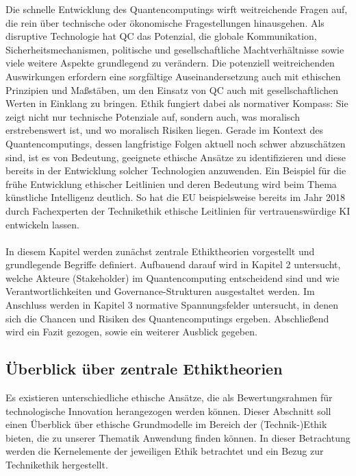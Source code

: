 Die schnelle Entwicklung des Quantencomputings wirft weitreichende Fragen auf, die rein über technische oder ökonomische Fragestellungen hinausgehen. Als disruptive Technologie hat QC das Potenzial, die globale Kommunikation, Sicherheitsmechanismen, politische und gesellschaftliche Machtverhältnisse sowie viele weitere Aspekte grundlegend zu verändern. Die potenziell weitreichenden Auswirkungen erfordern eine sorgfältige Auseinandersetzung auch mit ethischen Prinzipien und Maßstäben, um den Einsatz von QC auch mit gesellschaftlichen Werten in Einklang zu bringen. Ethik fungiert dabei als normativer Kompass: Sie zeigt nicht nur technische Potenziale auf, sondern auch, was moralisch erstrebenswert ist, und wo moralisch Risiken liegen. Gerade im Kontext des Quantencomputings, dessen langfristige Folgen aktuell noch schwer abzuschätzen sind, ist es von Bedeutung, geeignete ethische Ansätze zu identifizieren und diese bereits in der Entwicklung solcher Technologien anzuwenden. Ein Beispiel für die frühe Entwicklung ethischer Leitlinien und deren Bedeutung wird beim Thema künstliche Intelligenz deutlich. So hat die EU beispielsweise bereits im Jahr 2018 durch Fachexperten der Technikethik ethische Leitlinien für vertrauenswürdige KI entwickeln lassen. \cite{european_commission_directorate_general_for_communications_networks_content_and_technology_ethik-leitlinien_2019}
\\
\\
In diesem Kapitel werden zunächst zentrale Ethiktheorien vorgestellt und grundlegende Begriffe definiert. Aufbauend darauf wird in Kapitel 2 untersucht, welche Akteure (Stakeholder) im Quantencomputing entscheidend sind und wie Verantwortlichkeiten und Governance-Strukturen ausgestaltet werden. Im Anschluss werden in Kapitel 3  normative Spannungsfelder untersucht, in denen sich die Chancen und Risiken des Quantencomputings ergeben. Abschließend wird ein Fazit gezogen, sowie ein weiterer Ausblick gegeben.

\subsection{Überblick über zentrale Ethiktheorien}

Es existieren unterschiedliche ethische Ansätze, die als Bewertungsrahmen für technologische Innovation herangezogen werden können. Dieser Abschnitt soll einen Überblick über ethische Grundmodelle im Bereich der (Technik-)Ethik bieten, die zu unserer Thematik Anwendung finden können. In dieser Betrachtung werden die Kernelemente der jeweiligen Ethik betrachtet und ein Bezug zur Technikethik hergestellt.

